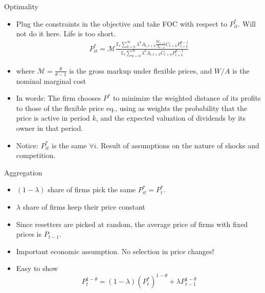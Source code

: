 \documentclass[11pt,aspectratio=169,xcolor={dvipsnames},hyperref={pdftex,pdfpagemode=UseNone,hidelinks,pdfdisplaydoctitle=true},usepdftitle=false]{beamer}
\begin{document}
\begin{frame}{Optimality}
\begin{itemize}
\item Plug the constraints in the objective and take FOC with respect to $P_{it}^*$. Will not do it here. Life is too short.
\begin{align*}
P^*_{it} = \mathcal{M} \frac{\mathbb{E}_t \sum_{k=0}^{\infty} \lambda^k \Lambda_{t,t+k} \frac{W_{t+k}}{A_{t+k}} C_{t+k} P_{t+k}^{\theta-1}}{\mathbb{E}_t \sum_{k=0}^{\infty} \lambda^k \Lambda_{t,t+k} C_{t+k} P_{t+k}^{\theta-1}}
\end{align*}
\pause
\item where $\mathcal{M} = \frac{\theta}{\theta-1}$ is the gross markup under flexible prices, and $W/A$ is the nominal marginal cost
\item In words: The firm chooses $P^*$ to minimize the weighted distance of its profits to those of the flexible price eq., using as weights the probability that the price is active in period $k$, and the expected valuation of dividends by its owner in that period.
\pause
\item Notice: $P^*_{it}$ is the same $\forall i$. Result of assumptions on the nature of shocks and competition.
\end{itemize}
\end{frame}

\begin{frame}{Aggregation}
\begin{itemize}
\item $(1-\lambda)$ share of firms pick the same $P^*_{it} = P^*_t$.
\pause
\item $\lambda$ share of firms keep their price constant
\pause
\item Since resetters are picked at random, the average price of firms with fixed prices is $P_{t-1}$.
\pause
\item Important economic assumption. No selection in price changes!
\pause
\item Easy to show
$$P_t^{1-\theta} = (1-\lambda) (P^*_t)^{1-\theta} + \lambda P^{1-\theta}_{t-1}$$
\end{itemize}
\end{frame}
\end{document}
